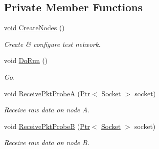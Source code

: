 \subsection*{Private Member Functions}
\begin{DoxyCompactItemize}
\item 
void \hyperlink{classns3_1_1olsr_1_1HelloRegressionTest_ab101b71625b566733aeee0f7cd82e9f1}{Create\+Nodes} ()
\begin{DoxyCompactList}\small\item\em Create \& configure test network. \end{DoxyCompactList}\item 
void \hyperlink{classns3_1_1olsr_1_1HelloRegressionTest_a469da2871e46fb6d56da5820f5aa1982}{Do\+Run} ()
\begin{DoxyCompactList}\small\item\em Go. \end{DoxyCompactList}\item 
void \hyperlink{classns3_1_1olsr_1_1HelloRegressionTest_a054ed2a66a9d8a840b9e0950808035d5}{Receive\+Pkt\+ProbeA} (\hyperlink{classns3_1_1Ptr}{Ptr}$<$ \hyperlink{classns3_1_1Socket}{Socket} $>$ socket)
\begin{DoxyCompactList}\small\item\em Receive raw data on node A. \end{DoxyCompactList}\item 
void \hyperlink{classns3_1_1olsr_1_1HelloRegressionTest_accc7c74bb7e64c7f15788aa23ba6e52a}{Receive\+Pkt\+ProbeB} (\hyperlink{classns3_1_1Ptr}{Ptr}$<$ \hyperlink{classns3_1_1Socket}{Socket} $>$ socket)
\begin{DoxyCompactList}\small\item\em Receive raw data on node B. \end{DoxyCompactList}\end{DoxyCompactItemize}
